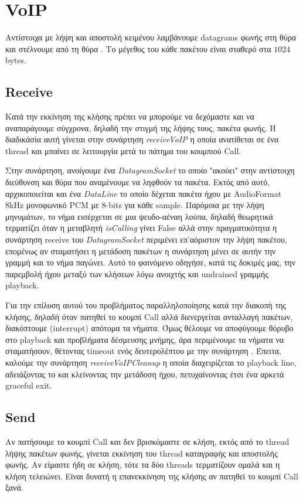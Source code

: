 \documentclass{article}
\begin{document}
\section{VoIP}
Αντίστοιχα με λήψη και αποστολή κειμένου λαμβάνουμε datagrams φωνής στη θύρα \voicedestport{} και 
στέλνουμε από τη θύρα \voicesrcport. Το μέγεθος του κάθε πακέτου είναι σταθερό στα $1024$ bytes.
\subsection{Receive}
Κατά την εκκίνηση της κλήσης πρέπει να μπορούμε να δεχόμαστε και να αναπαράγουμε σύγχρονα, δηλαδή την στιγμή της
λήψης τους, πακέτα φωνής. Η διαδικάσία αυτή γίνεται στην συνάρτηση \textit{receiveVoIP} η οποία ανατίθεται σε ένα
thread και μπαίνει σε λειτουργία μετά το πάτημα του κουμπιού Call. 

Στην συνάρτηση, ανοίγουμε ένα \textit{DatagramSocket} το οποίο "ακούει" στην αντίστοιχη διεύθυνση και θύρα που
αναμένουμε να ληφθούν τα πακέτα. Εκτός από αυτό, αρχικοποιείται και ένα \textit{DataLine} το οποίο δέχεται πακέτα
ήχου με AudioFormat 8kHz μονοφωνικό PCM με 8-bits για κάθε sample. Παρόμοια με την λήψη μηνυμάτων, το νήμα εισέρχεται
σε μια ψευδο-αέναη λούπα, δηλαδή θεωρητικά τερματίζει όταν η μεταβλητή \textit{isCalling} γίνει False αλλά στην
πραγματικότητα η συνάρτηση receive του \textit{DatagramSocket} περιμένει επ'αόριστον την λήψη πακέτου, επομένως
αν σταματήσει η μετάδοση πακέτων η συνάρτηση μένει σε αυτήν την γραμμή και το νήμα παγώνει. Αυτό το φαινόμενο
οδηγήσε, κατά τις δοκιμές μας, την παρεμβολή ήχου μεταξύ των κλήσεων λόγω ανοιχτής και undrained γραμμής playback.

Για την επίλυση αυτού του προβλήματος παραλληλοποίησης κατά την διακοπή της κλήσης, δηλαδή όταν πατηθεί το κουμπί
Call αλλά διενεργείται ανταλλαγή πακέτων, διακόπτουμε (interrupt) απότομα τα νήματα.
Όμως θέλουμε να αποφύγουμε θόρυβο στο playback και προβλήματα δέσμευσης μνήμης, άρα περιμένουμε τα νήματα να σταματήσουν,
θέτοντας timeout  ενός δευτερολέπτου με την συνάρτηση . Έπειτα, καλούμε 
την συνάρτηση \textit{receiveVoIPCleanup} η οποία διαχειρίζεται το playback line, αδειάζοντας το και κλείνοντας την 
μετάδοση ήχου, πετυχαίνοντας έτσι ένα αρκετά graceful exit. 

\subsection{Send}
Aν πατήσουμε το κουμπί Call και δεν βρισκόμαστε σε κλήση, 
εκτός από το thread λήψης πακέτων φωνής, γίνεται εκκίνηση του thread καταγραφής και αποστολής φωνής.
Αν είμαστε ήδη σε κλήση, τότε τα δύο threads τερματίζουν ομαλά και η κλήση τελειώνει. Είναι δυνατή
η επανεκκίνηση της κλήσης αν πατηθεί το κουμπί Call ξανά.
\end{document}
